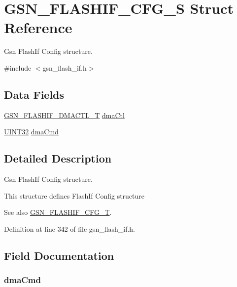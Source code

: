 \hypertarget{a00078}{
\section{GSN\_\-FLASHIF\_\-CFG\_\-S Struct Reference}
\label{a00078}
}


Gsn FlashIf Config structure.  




{\ttfamily \#include $<$gsn\_\-flash\_\-if.h$>$}

\subsection*{Data Fields}
\begin{DoxyCompactItemize}
\item 
\hyperlink{a00080}{GSN\_\-FLASHIF\_\-DMACTL\_\-T} \hyperlink{a00078_a11aeead5cc672407bce9c0447137dccf}{dmaCtl}
\item 
\hyperlink{a00660_gae1e6edbbc26d6fbc71a90190d0266018}{UINT32} \hyperlink{a00078_a646781d628db1e89dd218b1df21d7028}{dmaCmd}
\end{DoxyCompactItemize}


\subsection{Detailed Description}
Gsn FlashIf Config structure. 

This structure defines FlashIf Config structure

\begin{DoxySeeAlso}{See also}
\hyperlink{a00647_gaaf4a476f19c5d44c391a5e5dab872e9b}{GSN\_\-FLASHIF\_\-CFG\_\-T}. 
\end{DoxySeeAlso}


Definition at line 342 of file gsn\_\-flash\_\-if.h.



\subsection{Field Documentation}
\hypertarget{a00078_a646781d628db1e89dd218b1df21d7028}{
\subsubsection[{dmaCmd}]{ {\bf dmaCmd}}}
\label{a00078_a646781d628db1e89dd218b1df21d7028}


